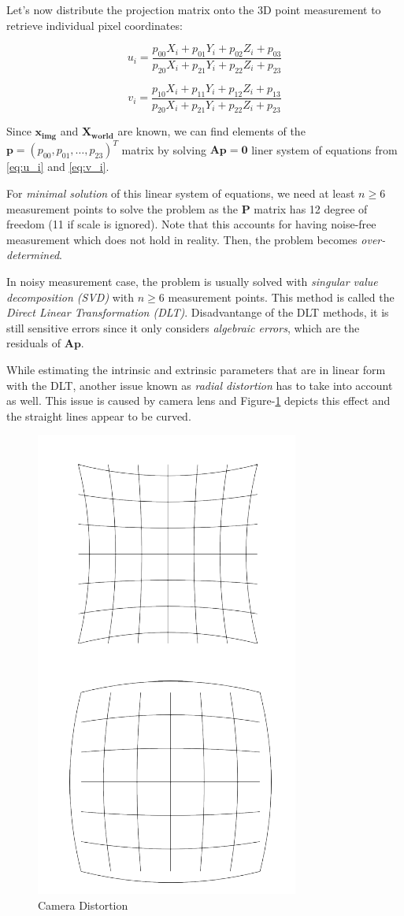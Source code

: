 \documentclass[a4paper]{report}
\numberwithin{figure}{section}
\begin{document}
Let's now distribute 
the projection matrix onto the 3D point measurement to retrieve individual 
pixel coordinates:

\begin{equation}
  u_i = 
  \frac
  {p_{00}X_i + p_{01}Y_i + p_{02}Z_i + p_{03}}
  {p_{20}X_i + p_{21}Y_i + p_{22}Z_i + p_{23}}
\end{equation} \label{eq:u_i}

\begin{equation}
  v_i = 
  \frac
  {p_{10}X_i + p_{11}Y_i + p_{12}Z_i + p_{13}}
  {p_{20}X_i + p_{21}Y_i + p_{22}Z_i + p_{23}}
\end{equation} \label{eq:v_i}


Since $\mathbf{x_{img}}$ and $\mathbf{X_{world}}$ are known,
we can find elements of the $\mathbf{p} = (p_{00}, p_{01}, \dots, p_{23})^T$ matrix 
by solving $\mathbf{Ap=0}$ liner system of equations from \ref{eq:u_i} and \ref{eq:v_i}.

For \textit{minimal solution} of this linear system of equations, 
we need at least $n \geq 6$ measurement points to solve the problem as 
the $\mathbf{P}$ matrix has 12 degree of freedom (11 if scale is ignored).
Note that this accounts for having 
noise-free measurement which does not hold in reality. Then, the problem 
becomes \textit{over-determined}.

In noisy measurement case, the problem is usually solved with
\textit{singular value decomposition (SVD)} with $n \geq 6$ measurement points. 
This method is called the \textit{Direct Linear Transformation (DLT)}.
Disadvantange of the DLT methods, it is still sensitive errors since 
it only considers \textit{algebraic errors}, which are the residuals of 
$\mathbf{Ap}$. 

While estimating the intrinsic and extrinsic parameters 
that are in linear form with the DLT, 
another issue known as \textit{radial distortion} 
has to take into account as well. This issue is caused by camera lens 
and Figure-\ref{fig:cam_distortion} depicts this effect and the straight lines 
appear to be curved. 

\begin{figure}[H]
	\centering
  \includegraphics[width=0.3\linewidth,natwidth=640,natheight=640]
  {fig/ref_imgs/cam_distortion.png}
  \caption{Camera Distortion}
  \label{fig:cam_distortion}
\end{figure}
\end{document}
